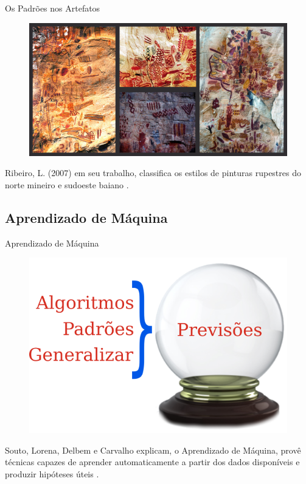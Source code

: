     \begin{frame}[fragile]{Os Padrões nos Artefatos}
        \begin{figure}[H]
        \begin{center}
            \includegraphics[scale=0.60]{images/arte_rupestre.png}
        \end{center}
        \end{figure}

        Ribeiro, L. (2007) em seu trabalho, classifica os estilos de pinturas
        rupestres do norte mineiro e sudoeste baiano
        \cite{ribeiro2007repensando}.
    \end{frame}

\subsection{Aprendizado de Máquina}
    \begin{frame}[fragile]{Aprendizado de Máquina}
        \begin{figure}[H]
        \begin{center}
            \includegraphics[scale=0.50]{images/previsao.png}
        \end{center}
        \end{figure}

        Souto, Lorena, Delbem e Carvalho explicam, o Aprendizado de Máquina,
        provê técnicas capazes de aprender automaticamente a partir dos dados
        disponíveis e produzir hipóteses úteis \cite{de2003tecnicas}.

  \end{frame}

